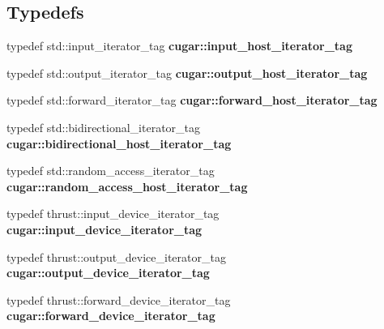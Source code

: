\subsection*{Typedefs}
\begin{DoxyCompactItemize}
\item 
\mbox{\label{group___basic_gafb22d9488740c45d6c9e785e2eea9965}} 
typedef std\+::input\+\_\+iterator\+\_\+tag {\bfseries cugar\+::input\+\_\+host\+\_\+iterator\+\_\+tag}
\item 
\mbox{\label{group___basic_gafce54b6492b885ac2275d61c838a794f}} 
typedef std\+::output\+\_\+iterator\+\_\+tag {\bfseries cugar\+::output\+\_\+host\+\_\+iterator\+\_\+tag}
\item 
\mbox{\label{group___basic_gaadbfa991b13e0221ed8066d57e3cc479}} 
typedef std\+::forward\+\_\+iterator\+\_\+tag {\bfseries cugar\+::forward\+\_\+host\+\_\+iterator\+\_\+tag}
\item 
\mbox{\label{group___basic_ga3ee9fcbe180d7c5996dbdfd1627502ca}} 
typedef std\+::bidirectional\+\_\+iterator\+\_\+tag {\bfseries cugar\+::bidirectional\+\_\+host\+\_\+iterator\+\_\+tag}
\item 
\mbox{\label{group___basic_ga7474176ff498d8323726ff1d8a6a2824}} 
typedef std\+::random\+\_\+access\+\_\+iterator\+\_\+tag {\bfseries cugar\+::random\+\_\+access\+\_\+host\+\_\+iterator\+\_\+tag}
\item 
\mbox{\label{group___basic_ga3c8b4941791aa54fd96d7d47362fb3cb}} 
typedef thrust\+::input\+\_\+device\+\_\+iterator\+\_\+tag {\bfseries cugar\+::input\+\_\+device\+\_\+iterator\+\_\+tag}
\item 
\mbox{\label{group___basic_ga757fa4ae8a13d7b82c5ece6bf6b481c7}} 
typedef thrust\+::output\+\_\+device\+\_\+iterator\+\_\+tag {\bfseries cugar\+::output\+\_\+device\+\_\+iterator\+\_\+tag}
\item 
\mbox{\label{group___basic_ga6c7adb2718bd15b8f1d4a9e2f8b788dd}} 
typedef thrust\+::forward\+\_\+device\+\_\+iterator\+\_\+tag {\bfseries cugar\+::forward\+\_\+device\+\_\+iterator\+\_\+tag}
\item 

\end{DoxyCompactItemize}
